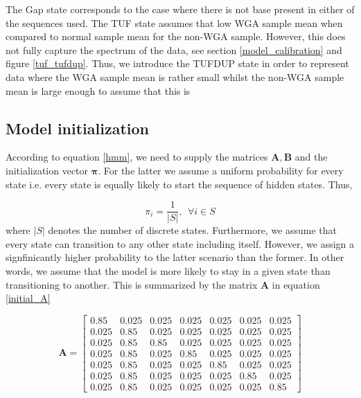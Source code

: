 The Gap state  corresponds to the case where there is not base present in either of the sequences used. The TUF state assumes that low WGA sample mean when compared to normal sample mean for the non-WGA sample. However, this does not fully capture the spectrum of the data, see section \ref{model_calibration} and figure \ref{tuf_tufdup}.  Thus, we introduce the  TUFDUP state in order to represent data where the WGA sample mean is rather small whilst the non-WGA sample mean is large enough to assume that this is 

\subsection{Model initialization}
\label{model_initialization}

According to equation \ref{hmm}, we need to supply the matrices $\mathbf{A}, \mathbf{B}$ and the initialization vector $\boldsymbol{\pi}$.
For the latter we assume a uniform probability for every state i.e. every state is equally likely to start the sequence of hidden states. Thus, 

\begin{equation}
\pi_i = \frac{1}{|S|}, ~~ \forall i \in S
\end{equation}
where $|S|$ denotes the number of discrete states.   Furthermore, we assume that every state can transition to any other state including itself. 
However, we assign a signfinicantly higher probability to the latter
scenario than the former. In other words, we assume that the model is more likely to stay in a given state than transitioning to another. This is summarized by the matrix $\mathbf{A}$ in equation \ref{initial_A}

\begin{equation}
\mathbf{A} = \begin{bmatrix}0.85 & 0.025 & 0.025 & 0.025 & 0.025 & 0.025 & 0.025 \\ 

0.025 & 0.85 & 0.025 & 0.025 & 0.025 & 0.025 & 0.025 \\
0.025 & 0.85 & 0.85 & 0.025 & 0.025 & 0.025 & 0.025 \\
0.025 & 0.85 & 0.025 & 0.85 & 0.025 & 0.025 & 0.025 \\
0.025 & 0.85 & 0.025 & 0.025 & 0.85 & 0.025 & 0.025 \\
0.025 & 0.85 & 0.025 & 0.025 & 0.025 & 0.85 & 0.025 \\
0.025 & 0.85 & 0.025 & 0.025 & 0.025 & 0.025 & 0.85 
\end{bmatrix}
\label{initial_A}
\end{equation}


